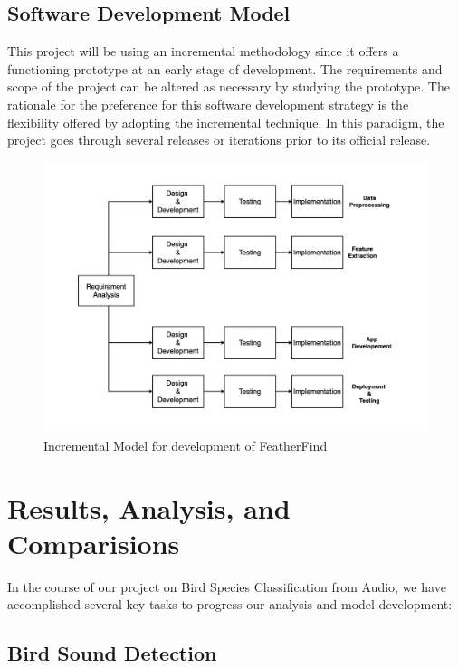 \newpage
\section{Software Development Model}
This project will be using an incremental methodology since it offers a
functioning prototype at an early stage of development. The requirements and
scope of the project can be altered as necessary by studying the prototype. The
rationale for the preference for this software development strategy is the
flexibility offered by adopting the incremental technique. In this paradigm,
the project goes through several releases or iterations prior to its official
release.
\begin{figure}[h!]
    \includegraphics[scale=0.25]{images/SDLC.png}
    \caption{Incremental Model for development of
        FeatherFind}%
\end{figure}

\chapter{Results, Analysis, and Comparisions}
In the course of our project on Bird Species Classification from Audio, we have
accomplished several key tasks to progress our analysis and model development:

\section{Bird Sound Detection}

